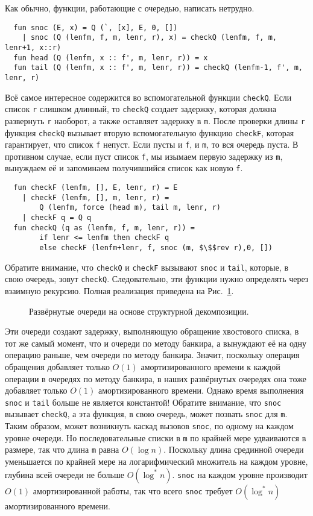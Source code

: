 Как обычно, функции, работающие с очередью, написать нетрудно.
\begin{lstlisting}
  fun snoc (E, x) = Q (`, [x], E, 0, [])
    | snoc (Q (lenfm, f, m, lenr, r), x) = checkQ (lenfm, f, m, lenr+1, x::r)
  fun head (Q (lenfm, x :: f', m, lenr, r)) = x
  fun tail (Q (lenfm, x :: f', m, lenr, r)) = checkQ (lenfm-1, f', m, lenr, r)
\end{lstlisting}
Всё самое интересное содержится во вспомогательной функции
\lstinline!checkQ!. Если список \lstinline!r! слишком длинный, то
\lstinline!checkQ! создает задержку, которая должна развернуть
\lstinline!r! наоборот, а также оставляет задержку в \lstinline!m!.
После проверки длины \lstinline!r! функция \lstinline!checkQ! вызывает
вторую вспомогательную функцию \lstinline!checkF!, которая
гарантирует, что список \lstinline!f! непуст. Если пусты и
\lstinline!f!, и \lstinline!m!, то вся очередь пуста. В противном
случае, если пуст список \lstinline!f!, мы изымаем первую задержку из
\lstinline!m!, вынуждаем её и запоминаем получившийся список как
новую \lstinline!f!.
\begin{lstlisting}
  fun checkF (lenfm, [], E, lenr, r) = E
    | checkF (lenfm, [], m, lenr, r) =
        Q (lenfm, force (head m), tail m, lenr, r)
    | checkF q = Q q
  fun checkQ (q as (lenfm, f, m, lenr, r)) =
        if lenr <= lenfm then checkF q
        else checkF (lenfm+lenr, f, snoc (m, $\$$rev r),0, [])
\end{lstlisting}
Обратите внимание, что \lstinline!checkQ! и \lstinline!checkF!
вызывают \lstinline!snoc! и \lstinline!tail!, которые, в свою очередь,
зовут \lstinline!checkQ!. Следовательно, эти функции нужно определять
через взаимную рекурсию. Полная реализация приведена на
Рис.~\ref{fig:10.2}.

\begin{figure}
  \centering
  
  \caption{Развёрнутые очереди на основе структурной декомпозиции.}
  \label{fig:10.2}
\end{figure}

Эти очереди создают задержку, выполняющую обращение хвостового списка,
в тот же самый момент, что и очереди по методу банкира, а вынуждают её
на одну операцию раньше, чем очереди по методу банкира. Значит,
поскольку операция обращения добавляет только $O(1)$ амортизированного
времени к каждой операции в очередях по методу банкира, в наших
развёрнутых очередях она тоже добавляет только $O(1)$
амортизированного времени. Однако время выполнения \lstinline!snoc! и
\lstinline!tail! больше не является константой! Обратите внимание, что
\lstinline!snoc! вызывает \lstinline!checkQ!, а эта функция, в свою
очередь, может позвать \lstinline!snoc! для \lstinline!m!. Таким
образом, может возникнуть каскад вызовов \lstinline!snoc!, по одному
на каждом уровне очереди. Но последовательные списки в
\lstinline!m! по крайней мере удваиваются в размере, так что длина
\lstinline!m! равна $O(\log n)$. Поскольку длина срединной очереди
уменьшается по крайней мере на логарифмический множитель на каждом
уровне, глубина всей очереди не больше $O(\log^* n)$. \lstinline!snoc! на
каждом уровне производит $O(1)$ амортизированной работы, так что всего
\lstinline!snoc! требует $O(\log^* n)$ амортизированного времени.

